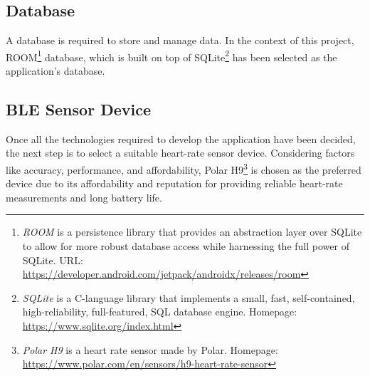 \subsection{Database}
A database is required to store and manage data. In the context of this project, ROOM\footnote{\emph{ROOM} is a persistence library that provides an abstraction layer over SQLite to allow for more robust database access while harnessing the full power of SQLite. URL: \url{https://developer.android.com/jetpack/androidx/releases/room}} database, which is built on top of SQLite\footnote{\emph{SQLite} is a C-language library that implements a small, fast, self-contained, high-reliability, full-featured, SQL database engine. Homepage: \url{https://www.sqlite.org/index.html}} has been selected as the application's database.

\subsection{BLE Sensor Device}
Once all the technologies required to develop the application have been decided, the next step is to select a suitable heart-rate sensor device. Considering factors like accuracy, performance, and affordability, Polar H9\footnote{\emph{Polar H9} is a heart rate sensor made by Polar. Homepage: \url{https://www.polar.com/en/sensors/h9-heart-rate-sensor}} is chosen as the preferred device due to its affordability and reputation for providing reliable heart-rate measurements and long battery life.